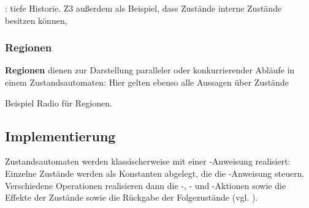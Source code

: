 \begin{tcolorbox}[colback=yellow!20]
\cite[Abb. 6.11.7, 342]{Bal05}: tiefe Historie. Z3 außerdem als Beispiel, dass Zustände interne Zustände besitzen können,
\end{tcolorbox}

\subsubsection*{Regionen}
\textbf{Regionen} dienen zur Darstellung paralleler oder konkurrierender Abläufe in einem Zustandsautomaten: Hier gelten ebenso alle Aussagen über Zustände


\begin{tcolorbox}[colback=yellow!20]
    Beispiel Radio für Regionen.
\end{tcolorbox}

\subsection{Implementierung}
Zustandsautomaten werden klassischerweise mit einer -Anweisung realisiert: Einzelne Zustände werden als Konstanten abgelegt, die die -Anweisung steuern.\\
Verschiedene Operationen realisieren dann die -, - und -Aktionen sowie die Effekte der Zustände sowie die Rückgabe der Folgezustände (vgl. \cite[75]{Buh09}).